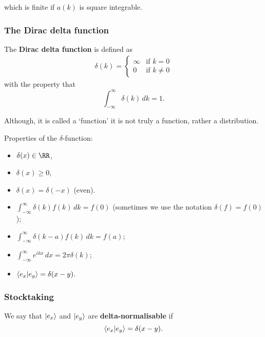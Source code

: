 \documentclass[12pt, a4paper]{article}
\begin{document}
which is finite if \(a(k)\) is square integrable.

\subsubsection{The Dirac delta function}

\begin{definition}
    The \textbf{Dirac delta function} is defined as 
    \[\begin{aligned}
        \delta(k) = \begin{cases}
            \infty &\text{if } k=0 \\
            0 &\text{if } k\neq 0
        \end{cases}
    \end{aligned}\]
    with the property that 
    \[\int_{-\infty}^{\infty} \delta(k) \, dk =1.\]
\end{definition}

\begin{mdremark}
    Although, it is called a `function' it is not truly a function, rather a distribution. 
\end{mdremark}

\begin{mdthm}
    Properties of the \(\delta\)-function:
    \begin{itemize}
        \item \(\delta(x) \in \RR\),
        \item \(\delta(x) \geq 0\),
        \item \(\delta(x)=\delta(-x)\) (even).
        \item \(\int_{-\infty}^{\infty} \delta(k) f(k) \, dk = f(0)\) (sometimes we use the notation \(\delta(f)= f(0)\));
        \item \(\int_{-\infty}^{\infty} \delta(k-a)f(k) \, dk = f(a)\);
        \item \(\int_{-\infty}^{\infty} e^{ikx} \, dx = 2\pi \delta(k)\);
        \item \(\bra{e_x}\ket{e_y}=\delta(x-y)\).
    \end{itemize}
\end{mdthm}

\subsubsection{Stocktaking}

\begin{definition}
    We say that \(\ket{e_x}\) and \(\ket{e_y}\) are \textbf{delta-normalisable} if 
    \[\bra{e_x}\ket{e_y}=\delta(x-y).\]
\end{definition}
\end{document}
